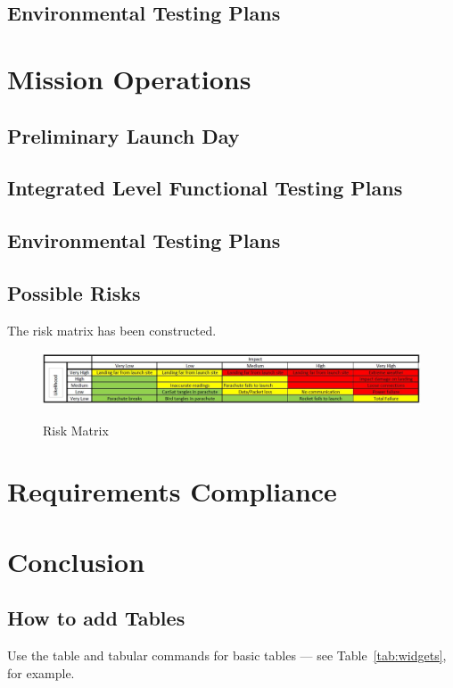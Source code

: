 \documentclass[10pt, a4paper]{article}
\begin{document}
\subsection{Environmental Testing Plans}


\newpage

\section{Mission Operations}
\subsection{Preliminary Launch Day}
\subsection{Integrated Level Functional Testing Plans}
\subsection{Environmental Testing Plans}
\subsection{Possible Risks}
The risk matrix has been constructed.
\begin{figure}[H]
\centering
\includegraphics[scale =0.4]{risk.JPG}
\label{fig:risk}
\caption{Risk Matrix}
\end{figure}

\newpage

\section{Requirements Compliance}

\section{Conclusion}




\subsection{How to add Tables}

Use the table and tabular commands for basic tables --- see Table~\ref{tab:widgets}, for example. 
\end{document}
